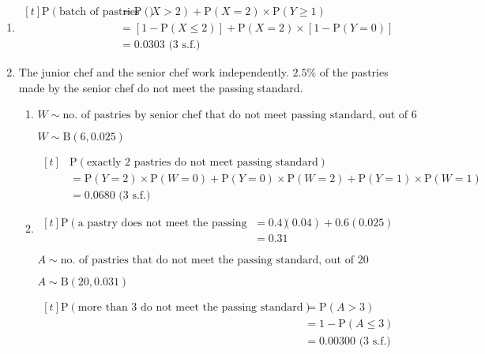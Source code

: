 \documentclass[11pt,a4paper]{book}
\begin{document}
\begin{example}
\begin{enumerate}[label=(\alph*)]
\item 
$
\begin{aligned}[t]
\text{P}\left(\text{batch of pastries is rejected}\right) & =\text{P}\left(X>2\right)+\text{P}\left(X=2\right)\times\text{P}\left(Y\geq1\right)\\
 & =\left[1-\text{P}\left(X\leq2\right)\right]+\text{P}\left(X=2\right)\times\left[1-\text{P}\left(Y=0\right)\right]\\
 & =0.0303\text{ (3 s.f.)}
\end{aligned}
$

\item  The junior chef and the senior chef work independently. $2.5\%$
of the pastries made by the senior chef do not meet the passing standard.

\begin{enumerate}[label=(\roman*)] 

\item  $W\sim\text{no. of pastries by senior chef that do not meet passing standard, out of 6}$

$W\sim\text{B}\left(6,0.025\right)$

$
\begin{aligned}[t]
 & \text{P}\left(\text{exactly 2 pastries do not meet passing standard}\right)\\
 & =\text{P}\left(Y=2\right)\times\text{P}\left(W=0\right)+\text{P}\left(Y=0\right)\times\text{P}\left(W=2\right)+\text{P}\left(Y=1\right)\times\text{P}\left(W=1\right)\\
 & =0.0680\text{ (3 s.f.)}
\end{aligned}
$

\item  
$
\begin{aligned}[t]
\text{P}\left(\text{a pastry does not meet the passing standard}\right) & =0.4\left(0.04\right)+0.6\left(0.025\right)\\
 & =0.31
\end{aligned}
$

$A\sim\text{no. of pastries that do not meet the passing standard, out of 20}$

$A\sim\text{B}\left(20,0.031\right)$

$
\begin{aligned}[t]
\text{P}\left(\text{more than 3 do not meet the passing standard}\right) & =\text{P}\left(A>3\right)\\
 & =1-\text{P}\left(A\leq3\right)\\
 & =0.00300\text{ (3 s.f.)}
\end{aligned}
$

\end{enumerate}

\end{enumerate}

\end{example}
\end{document}
